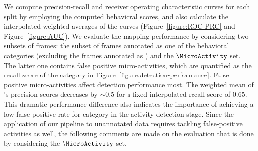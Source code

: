We compute precision-recall and receiver operating characteristic curves for each split by employing the computed behavioral scores, and also calculate the interpolated weighted averages of the curves (Figure~\ref{figure:ROC-PRC} and Figure~\ref{figure:AUC}).
We evaluate the mapping performance by considering two subsets of frames: the subset of frames annotated as one of the behavioral categories (excluding the frames annotated as \QuiescentOther) and the $\MicroActivity$ set.
The latter one contains false positive micro-activities, which are quantified as the recall score of the \QuiescentOther category in Figure~\ref{figure:detection-performance}.
False positive micro-activities affect \HaltereSwitch detection performance most. The weighted mean of \HaltereSwitch's precision scores decreases by ${\sim}0.5$ for a fixed interpolated recall score of $0.65$.
This dramatic performance difference also indicates the importance of achieving a low false-positive rate for \QuiescentOther category in the activity detection stage.
Since the application of our pipeline to unannotated data requires tackling false-positive activities as well, the following comments are made on the evaluation that is done by considering the $\MicroActivity$ set.

